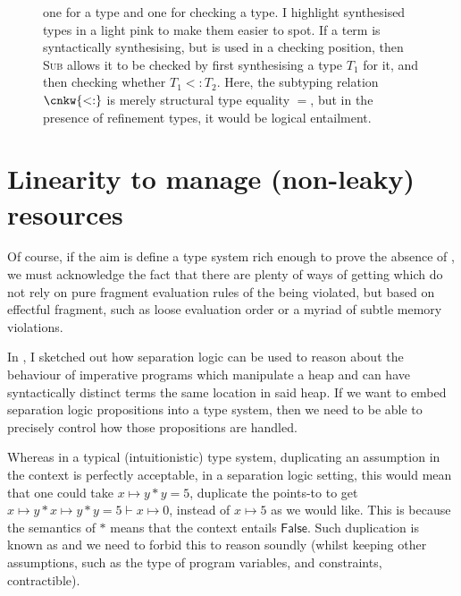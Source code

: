 \begin{figure}
{    one for  a type and one for checking a type.
    I highlight synthesised types in a \colorbox{pink!30}{light pink} to make
    them easier to spot.
    If a term is syntactically synthesising, but is used in a checking position,
    then \textsc{Sub} allows it to be checked by first synthesising a type $T_1$
    for it, and then checking whether $T_1 <: T_2$. Here, the subtyping
    relation $\cnkw{<:}$ is merely structural type equality $=$, but in the
    presence of refinement types, it would be logical
    entailment.}\label{fig:simple-bidir}
\end{figure}

\section{Linearity to manage (non-leaky) resources}

Of course, if the aim is define a type system rich enough to prove the absence
of , we must acknowledge the fact that there are plenty of ways of
getting  which do not rely on pure fragment evaluation rules of the
 being violated, but based on effectful fragment, such as loose
evaluation order or a myriad of subtle memory violations.

In , I sketched out how separation logic can be
used to reason about the behaviour of imperative programs which manipulate a
heap and can have syntactically distinct terms  the same location
in said heap. If we want to embed separation logic propositions into a type
system, then we need to be able to precisely control how those propositions are
handled.

Whereas in a typical (intuitionistic) type system, duplicating an assumption in
the context is perfectly acceptable, in a separation logic setting, this would
mean that one could take $x \mapsto{} y \ast{} y = 5$, duplicate the points-to
to get $x \mapsto{} y \ast{} x \mapsto{} y \ast y = 5 \vdash{} x \mapsto{} 0$,
instead of $x \mapsto{} 5$ as we would like. This is because the semantics of
$\ast{}$ means that the context entails $\mathsf{False}$. Such duplication is
known as  and we need to forbid this to reason soundly
(whilst keeping other assumptions, such as the type of  program
variables, and constraints, contractible).

